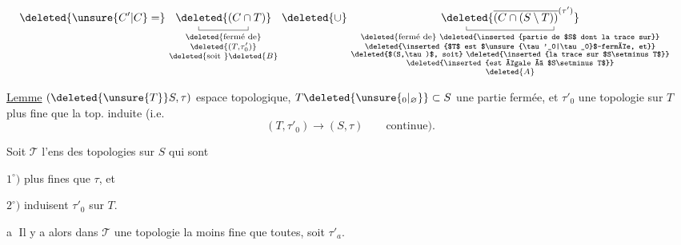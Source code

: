 
\[
\begin{aligned}
 &\deleted{\unsure{C'|C}=}\ \underset{\substack{\text{\deleted{fermé de}}\\\deleted{(T,\tau'_0)}\\\text{\deleted{soit }}\deleted{B}}}{\underset{\rule{.35pt}{.35em}\rule{4.4em}{.35pt}\rule{.35pt}{.35em}}{\deleted{(C\cap T)}}}
 \ \deleted{\cup}\ 
 \underset{\substack{\text{\deleted{fermé de} \deleted{\inserted{partie de $S$ dont la trace sur}}}\\
 \text{\deleted{\inserted{$T$ est $\unsure{\tau'_0|\tau_0}$-fermée, et}}}\\
 \text{\deleted{$(S,\tau)$, soit} \deleted{\inserted{la trace sur $S\setminus T$}}}\\
 \text{\deleted{\inserted{est égale à $S\setminus T$}}}\\\deleted{A}}}{\underset{\rule{.35pt}{.35em}\rule{7.8em}{.35pt}\rule{.35pt}{.35em}}{\deleted{\overline{(C\cap(S\setminus T))}^{(\tau')}}}}
\end{aligned}
\]

\uline{Lemme}\quad {} $(\deleted{\unsure{T}}S,\tau)$ espace topologique, $T\deleted{\unsure{_0|_{\varnothing}}}\subset S$ une partie fermée, et $\tau'_0$ une topologie  sur $T$ plus fine que la top. induite (i.e.
\[
 (T,\tau'_0)\mathbin{\longrightarrow}(S,\tau)\qquad\text{continue).}
\]


 Soit \uline{$\mathscr{T}$} l'ens des topologies sur $S$ qui sont

$1^\circ)$ plus fines que $\tau$, et

$2^\circ)$ induisent $\tau'_0$ sur $T$.

\textcircled{a} Il y a alors dans \uline{$\mathscr T$} une topologie la moins fine que toutes, soit $\tau'_{a}$.

